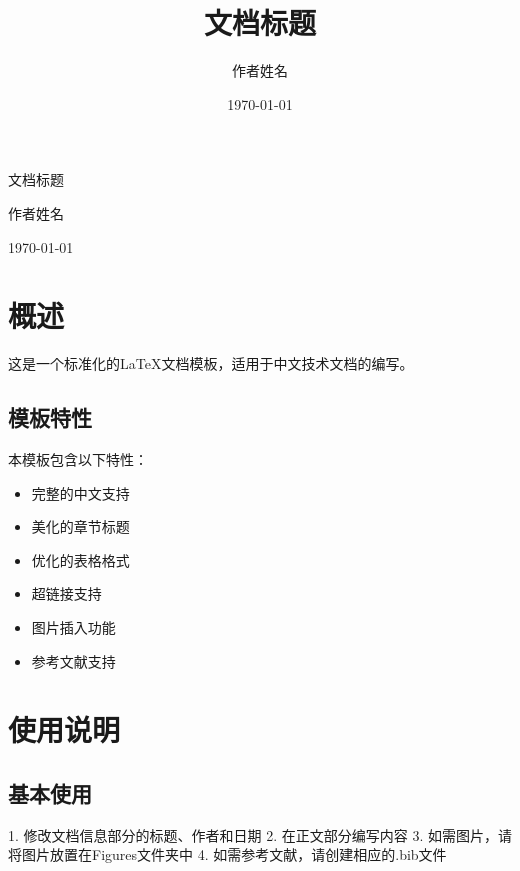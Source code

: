 \documentclass[fontset=windows]{article}
\title{\heiti\zihao{2} 文档标题}
\author{\songti 作者姓名}
\date{\today}
\begin{document}
\begin{titlepage}
    \centering
    \vspace*{4cm}
    {\heiti{} 文档标题\par}
    \vspace{2cm}
    {\songti{} 作者姓名\par}
    \vspace{0.5cm}
    { \today\par}
    \vfill
\end{titlepage}

\clearpage


\section{概述}
这是一个标准化的LaTeX文档模板，适用于中文技术文档的编写。

\subsection{模板特性}
本模板包含以下特性：
\begin{itemize}
    \item 完整的中文支持
    \item 美化的章节标题
    \item 优化的表格格式
    \item 超链接支持
    \item 图片插入功能
    \item 参考文献支持
\end{itemize}

\section{使用说明}
\subsection{基本使用}
1. 修改文档信息部分的标题、作者和日期
2. 在正文部分编写内容
3. 如需图片，请将图片放置在Figures文件夹中
4. 如需参考文献，请创建相应的.bib文件
\end{document}
